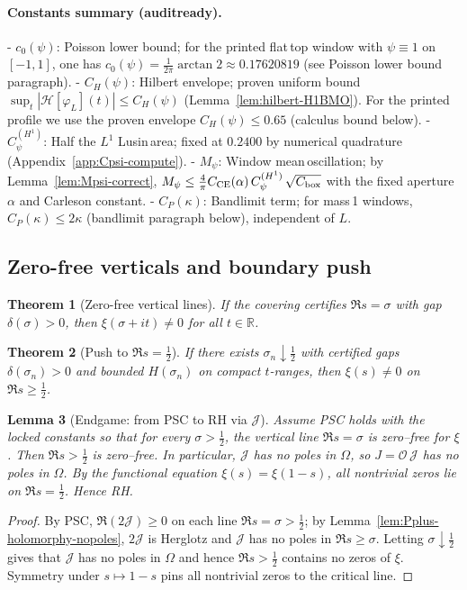 \documentclass[11pt]{article}
\newtheorem{theorem}{Theorem}
\newtheorem{lemma}[theorem]{Lemma}
\theoremstyle{definition}
\theoremstyle{remark}
\newcommand{\R}{\mathbb{R}}
\begin{document}
\paragraph{Constants summary (audit\textendash ready).}
- \textbf{$c_0(\psi)$}: Poisson lower bound; for the printed flat\,top window with $\psi\equiv 1$ on $[-1,1]$, one has $c_0(\psi)=\tfrac{1}{2\pi}\arctan 2\approx 0.17620819$ (see Poisson lower bound paragraph).
- \textbf{$C_H(\psi)$}: Hilbert envelope; proven uniform bound $\sup_t|\mathcal H[\varphi_L](t)|\le C_H(\psi)$ (Lemma~\ref{lem:hilbert-H1BMO}). For the printed profile we use the proven envelope $C_H(\psi)\le 0.65$ (calculus bound below).
- \textbf{$C_\psi^{(H^1)}$}: Half the $L^1$ Lusin\,area; fixed at $0.2400$ by numerical quadrature (Appendix~\ref{app:Cpsi-compute}).
- \textbf{$M_\psi$}: Window mean\,oscillation; by Lemma~\ref{lem:Mpsi-correct},
\(M_\psi\le \tfrac{4}{\pi}C_{\mathrm{CE}}(\alpha)\,C_\psi^{(H^1)}\,\sqrt{C_{\rm box}}\) with the fixed aperture $\alpha$ and Carleson constant.
- \textbf{$C_P(\kappa)$}: Bandlimit term; for mass\,1 windows, $C_P(\kappa)\le 2\kappa$ (bandlimit paragraph below), independent of $L$.

\subsection*{Zero-free verticals and boundary push}
\begin{theorem}[Zero-free vertical lines]\label{thm:lines}
If the covering certifies $\Re s=\sigma$ with gap $\delta(\sigma)>0$, then $\xi(\sigma+it)\ne 0$ for all $t\in\R$.
\end{theorem}

\begin{theorem}[Push to $\Re s=\tfrac12$]\label{thm:boundary}
If there exists $\sigma_n\downarrow\tfrac12$ with certified gaps $\delta(\sigma_n)>0$ and bounded $H(\sigma_n)$ on compact $t$-ranges, then $\xi(s)\ne 0$ on $\Re s\ge\tfrac12$.
\end{theorem}

\begin{lemma}[Endgame: from PSC to RH via $\mathcal J$]\label{lem:endgame}
Assume PSC holds with the locked constants so that for every $\sigma> \tfrac12$, the vertical line $\Re s=\sigma$ is zero–free for $\xi$. Then $\Re s>\tfrac12$ is zero–free. In particular, $\mathcal J$ has no poles in $\Omega$, so $J=\mathcal O\,\mathcal J$ has no poles in $\Omega$. By the functional equation $\xi(s)=\xi(1-s)$, all nontrivial zeros lie on $\Re s=\tfrac12$. Hence RH.
\end{lemma}
\begin{proof}
By PSC, $\Re(2\mathcal J)\ge0$ on each line $\Re s=\sigma>\tfrac12$; by Lemma~\ref{lem:Pplus-holomorphy-nopoles}, $2\mathcal J$ is Herglotz and $\mathcal J$ has no poles in $\Re s\ge\sigma$. Letting $\sigma\downarrow\tfrac12$ gives that $\mathcal J$ has no poles in $\Omega$ and hence $\Re s>\tfrac12$ contains no zeros of $\xi$. Symmetry under $s\mapsto 1-s$ pins all nontrivial zeros to the critical line.
\end{proof}
\end{document}

